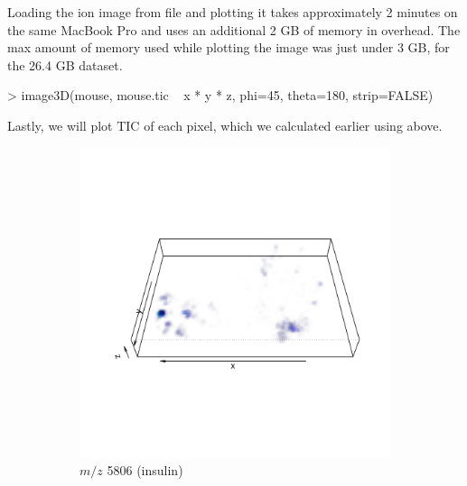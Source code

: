 \documentclass[a4paper]{article}
\begin{document}
Loading the ion image from file and plotting it takes approximately 2 minutes on the same MacBook Pro and uses an additional 2 GB of memory in overhead. The max amount of memory used while plotting the image was just under 3 GB, for the 26.4 GB dataset.

\begin{Schunk}
\begin{Sinput}
> image3D(mouse, mouse.tic ~ x * y * z, phi=45, theta=180, strip=FALSE)
\end{Sinput}
\end{Schunk}

Lastly, we will plot TIC of each pixel, which we calculated earlier using  above.

\begin{figure}[h]
\centering
\begin{subfigure}{.4\textwidth}
  \centering
\includegraphics{matter-extra-010}
\caption{\small $m/z$ 5806 (insulin)}
\label{fig:mz5806}
\end{subfigure}
\begin{subfigure}{.4\textwidth}
  \centering

\end{subfigure}
\end{figure}
\end{document}
